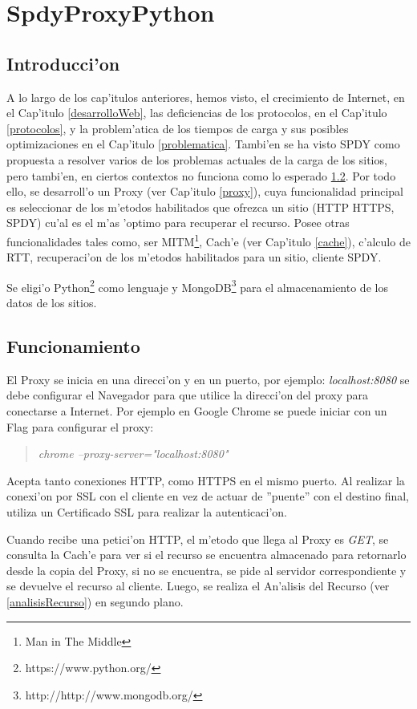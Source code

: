 \chapter{SpdyProxyPython}
\label{spdyproxypython}

\section{Introducci'on}

A lo largo de los cap'itulos anteriores, hemos visto, el crecimiento de Internet, en el Cap'itulo \ref{desarrolloWeb}, las deficiencias de los protocolos, en el Cap'itulo \ref{protocolos}, y la problem'atica de los tiempos de carga y sus posibles optimizaciones en el Cap'itulo \ref{problematica}. Tambi'en se ha visto SPDY como propuesta a resolver varios de los problemas actuales de la carga de los sitios, pero tambi'en, en ciertos contextos no funciona como lo esperado \ref{}. Por todo ello, se desarroll'o un Proxy (ver Cap'itulo \ref{proxy}), cuya funcionalidad principal es seleccionar de los m'etodos habilitados que ofrezca un sitio (HTTP HTTPS, SPDY) cu'al es el m'as 'optimo para recuperar el recurso. Posee otras funcionalidades tales como, ser MITM\footnote{Man in The Middle}, Cach'e (ver Cap'itulo \ref{cache}), c'alculo de RTT, recuperaci'on de los m'etodos habilitados para un sitio, cliente SPDY.

Se eligi'o Python\footnote{https://www.python.org/} como lenguaje y MongoDB\footnote{http://http://www.mongodb.org/} para el almacenamiento de los datos de los sitios.

\section{Funcionamiento}

El Proxy se inicia en una direcci'on y en un puerto, por ejemplo: \textit{localhost:8080} se debe configurar el Navegador para que utilice la direcci'on del proxy para conectarse a Internet. Por ejemplo en Google Chrome se puede iniciar con un Flag para configurar el proxy:
\begin{quote}
\textit{chrome --proxy-server="localhost:8080"}
\end{quote}
Acepta tanto conexiones HTTP, como HTTPS en el mismo puerto. Al realizar la conexi'on por SSL con el cliente en vez de actuar de ''puente'' con el destino final, utiliza un Certificado SSL para realizar la autenticaci'on.

Cuando recibe una petici'on HTTP, el m'etodo que llega al Proxy es \textit{GET}, se consulta la Cach'e para ver si el recurso se encuentra almacenado para retornarlo desde la copia del Proxy, si no se encuentra, se pide al servidor correspondiente y se devuelve el recurso al cliente. Luego, se realiza el An'alisis del Recurso (ver \ref{analisisRecurso}) en segundo plano.

